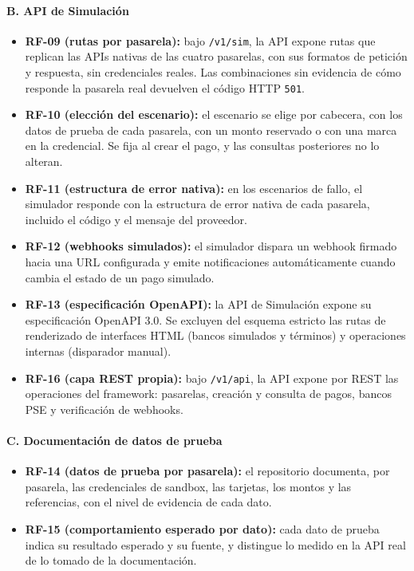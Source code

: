 \paragraph{B. API de Simulación}
\begin{itemize}
    \item \textbf{RF-09 (rutas por pasarela):} bajo \texttt{/v1/sim}, la API expone rutas que replican las APIs nativas de las cuatro pasarelas, con sus formatos de petición y respuesta, sin credenciales reales. Las combinaciones sin evidencia de cómo responde la pasarela real devuelven el código HTTP \texttt{501}.
    \item \textbf{RF-10 (elección del escenario):} el escenario se elige por cabecera, con los datos de prueba de cada pasarela, con un monto reservado o con una marca en la credencial. Se fija al crear el pago, y las consultas posteriores no lo alteran.
    \item \textbf{RF-11 (estructura de error nativa):} en los escenarios de fallo, el simulador responde con la estructura de error nativa de cada pasarela, incluido el código y el mensaje del proveedor.
    \item \textbf{RF-12 (webhooks simulados):} el simulador dispara un webhook firmado hacia una URL configurada y emite notificaciones automáticamente cuando cambia el estado de un pago simulado.
    \item \textbf{RF-13 (especificación OpenAPI):} la API de Simulación expone su especificación OpenAPI 3.0. Se excluyen del esquema estricto las rutas de renderizado de interfaces HTML (bancos simulados y términos) y operaciones internas (disparador manual).
    \item \textbf{RF-16 (capa REST propia):} bajo \texttt{/v1/api}, la API expone por REST las operaciones del framework: pasarelas, creación y consulta de pagos, bancos PSE y verificación de webhooks.
\end{itemize}

\paragraph{C. Documentación de datos de prueba}
\begin{itemize}
    \item \textbf{RF-14 (datos de prueba por pasarela):} el repositorio documenta, por pasarela, las credenciales de sandbox, las tarjetas, los montos y las referencias, con el nivel de evidencia de cada dato.
    \item \textbf{RF-15 (comportamiento esperado por dato):} cada dato de prueba indica su resultado esperado y su fuente, y distingue lo medido en la API real de lo tomado de la documentación.
\end{itemize}

